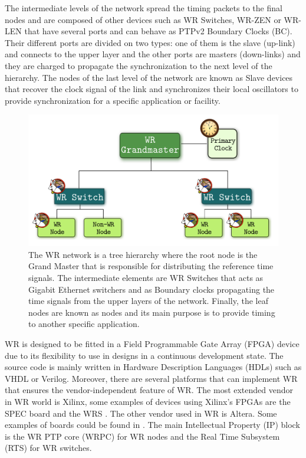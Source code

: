 The intermediate levels of the network spread the timing packets to the final 
nodes and are composed of other devices such as WR Switches, WR-ZEN or WR-LEN 
that have several ports and can behave as PTPv2 Boundary Clocks (BC). Their 
different ports are divided on two types: one of them is the slave (up-link) 
and connects to the upper layer and the other ports are masters (down-links) 
and they are charged to propagate the synchronization to the next level of the 
hierarchy. The nodes of the last level of the network are known as Slave 
devices that recover the clock signal of the link and synchronizes their local 
oscillators to provide synchronization for a specific application or facility.

\begin{figure}[H]
	\centering
	\includegraphics[scale=0.4]{img/wr_hierarchy}
	\caption{The WR network is a tree hierarchy where the root node is the Grand Master that is responsible for distributing the reference time signals. The intermediate elements are WR Switches that acts as Gigabit Ethernet switchers and as Boundary clocks propagating the time signals from the upper layers of the network. Finally, the leaf nodes are known as nodes and its main purpose is to provide timing to another specific application.}
	\label{fig:wr_hierarchy}
\end{figure}


WR is designed to be fitted in a Field Programmable Gate Array (FPGA) device due to its flexibility to use in designs in a continuous development state. The source code is mainly written in Hardware Description Languages (HDLs) such as VHDL or Verilog. Moreover, there are several platforms that can implement WR that ensures the vendor-independent feature of WR. The most extended vendor in WR world is Xilinx, some examples of devices using Xilinx's FPGAs are the SPEC board \cite{ohwr:spec} and the WRS \cite{ohwr:wrs}. The other vendor used in WR is Altera. Some examples of boards could be found in \cite{cesar-altera-wr}. The main Intellectual Property (IP) block is the WR PTP core (WRPC) for WR nodes and the Real Time Subsystem (RTS) for WR switches. 

